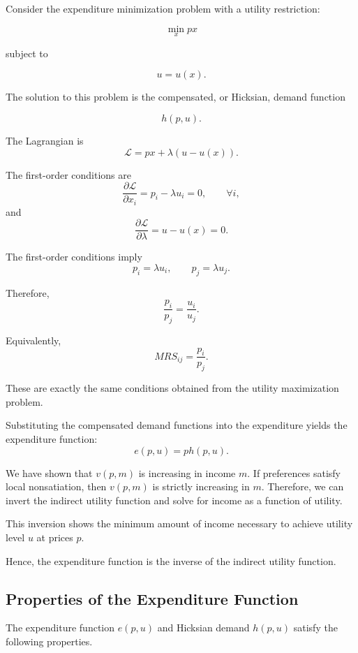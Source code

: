 Consider the expenditure minimization problem with a utility restriction:

\[
\min_x px
\]

subject to

\[
u=u(x).
\]

The solution to this problem is the compensated, or Hicksian, demand function

\[
h(p,u).
\]

The Lagrangian is
\[
\mathcal{L}
=
px+\lambda(u-u(x)).
\]

The first-order conditions are
\[
\frac{\partial \mathcal{L}}{\partial x_i}
=
p_i-\lambda u_i
=
0,
\qquad
\forall i,
\]
and
\[
\frac{\partial \mathcal{L}}{\partial \lambda}
=
u-u(x)
=
0.
\]

The first-order conditions imply
\[
p_i=\lambda u_i,
\qquad
p_j=\lambda u_j.
\]

Therefore,
\[
\frac{p_i}{p_j}
=
\frac{u_i}{u_j}.
\]

Equivalently,
\[
MRS_{ij}
=
\frac{p_i}{p_j}.
\]

These are exactly the same conditions obtained from the utility maximization problem.

Substituting the compensated demand functions into the expenditure yields the expenditure function:
\[
e(p,u)=ph(p,u).
\]

We have shown that \(v(p,m)\) is increasing in income \(m\). If preferences satisfy local nonsatiation, then \(v(p,m)\) is strictly increasing in \(m\). Therefore, we can invert the indirect utility function and solve for income as a function of utility.

This inversion shows the minimum amount of income necessary to achieve utility level \(u\) at prices \(p\).

Hence, the expenditure function is the inverse of the indirect utility function.

\subsection{Properties of the Expenditure Function}

The expenditure function \(e(p,u)\) and Hicksian demand \(h(p,u)\) satisfy the following properties.

